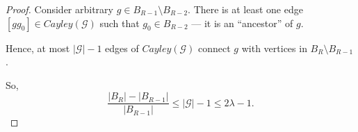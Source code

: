 \documentclass[10pt,a4paper]{amsart}
\theoremstyle{plain}
\theoremstyle{definition}
\begin{document}
    \begin{proof}
    Consider  arbitrary $g\in B_{R-1}\setminus B_{R-2}$. There is at least one edge $[g  g_0] \in Cayley(\mathcal{G})$ such that $g_0 \in B_{R-2}$ --- it is an ``ancestor'' of $g$. 
    

   

    Hence, at most $|\mathcal{G}| -1$ edges of $Cayley(\mathcal{G})$ connect $g$ with vertices in $B_R\setminus B_{R-1}$. 
    
    So, $$\dfrac{|B_R| - |B_{R-1}|}{|B_{R-1}|}\leq |\mathcal{G}|-1 \leq 2\lambda-1.$$
    
    \end{proof}
\end{document}

